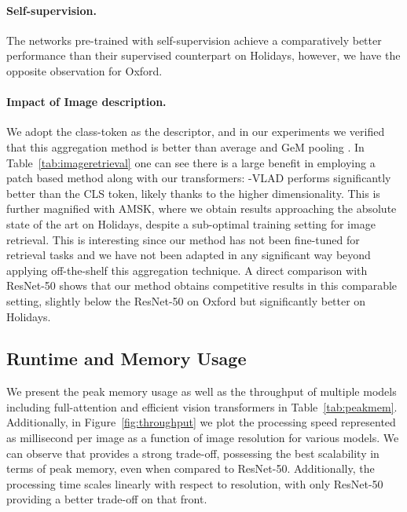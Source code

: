 \paragraph{Self-supervision.} The networks \ours pre-trained with self-supervision achieve a comparatively better performance than their supervised counterpart on Holidays, however, we have the opposite observation for {}Oxford. 

\paragraph{Impact of Image description. } We adopt the class-token as the descriptor, and in our experiments we verified that this aggregation method is better than average and GeM pooling \cite{Boureau2010ATA,radenovic2018fine}. In Table~\ref{tab:imageretrieval} one can see there is a large benefit in employing a patch based method along with our \ours transformers: \OURS-VLAD performs significantly better than the CLS token, likely thanks to the higher dimensionality. This is further magnified with AMSK, where we obtain results approaching the absolute state of the art on Holidays, despite a sub-optimal training setting for image retrieval. This is interesting since our method has not been fine-tuned for retrieval tasks and we have not been adapted in any significant way beyond applying off-the-shelf this aggregation technique. 
A direct comparison with ResNet-50 shows that our \ours method obtains competitive results in this comparable setting, slightly below the ResNet-50 on {}Oxford but significantly better on Holidays. 

\nocite{thomee2016yfcc100m} 








\subsection{Runtime and Memory Usage}

We present the peak memory usage as well as the throughput of multiple models including full-attention and efficient vision transformers in Table~\ref{tab:peakmem}. Additionally, in Figure~\ref{fig:throughput} we plot the processing speed represented as millisecond per image as a function of image resolution for various models. We can observe that \ours provides a strong trade-off, possessing the best scalability in terms of peak memory, even when compared to ResNet-50. Additionally, the processing time scales linearly with respect to resolution, with only ResNet-50 providing a better trade-off on that front.


